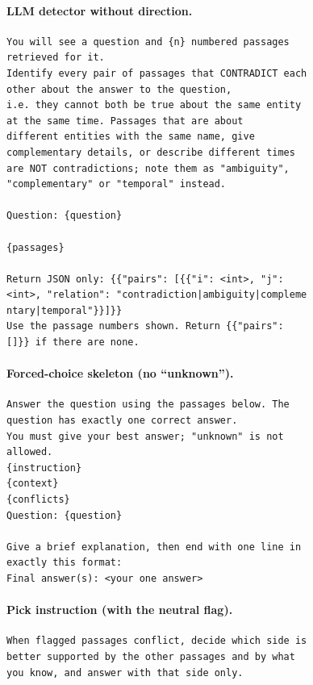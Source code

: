 \paragraph{LLM detector without direction.}
\begin{footnotesize}\begin{verbatim}
You will see a question and {n} numbered passages
retrieved for it.
Identify every pair of passages that CONTRADICT each
other about the answer to the question,
i.e. they cannot both be true about the same entity
at the same time. Passages that are about
different entities with the same name, give
complementary details, or describe different times
are NOT contradictions; note them as "ambiguity",
"complementary" or "temporal" instead.

Question: {question}

{passages}

Return JSON only: {{"pairs": [{{"i": <int>, "j":
<int>, "relation": "contradiction|ambiguity|compleme
ntary|temporal"}}]}}
Use the passage numbers shown. Return {{"pairs":
[]}} if there are none.
\end{verbatim}\end{footnotesize}
\paragraph{Forced-choice skeleton (no ``unknown'').}
\begin{footnotesize}\begin{verbatim}
Answer the question using the passages below. The
question has exactly one correct answer.
You must give your best answer; "unknown" is not
allowed.
{instruction}
{context}
{conflicts}
Question: {question}

Give a brief explanation, then end with one line in
exactly this format:
Final answer(s): <your one answer>
\end{verbatim}\end{footnotesize}
\paragraph{Pick instruction (with the neutral flag).}
\begin{footnotesize}\begin{verbatim}
When flagged passages conflict, decide which side is
better supported by the other passages and by what
you know, and answer with that side only.
\end{verbatim}\end{footnotesize}
